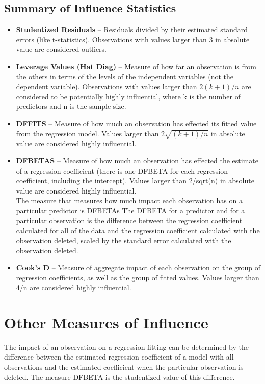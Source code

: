 \documentclass[residuals.tex]{subfiles}
\begin{document}
	\subsection{Summary of Influence Statistics}
	\begin{itemize}
		\item	\textbf{Studentized Residuals} – Residuals divided by their estimated standard errors (like t-statistics). Observations with values larger than 3 in absolute value are considered outliers.
		\item	\textbf{Leverage Values (Hat Diag)} – Measure of how far an observation is from the others in terms of the levels of the independent variables (not the dependent variable). Observations with values larger than $2(k+1)/n$ are considered to be potentially highly influential, where k is the number of predictors and n is the sample size.
		\item	\textbf{DFFITS} – Measure of how much an observation has effected its fitted value from the regression model. Values larger than $2\sqrt{(k+1)/n}$ in absolute value are considered highly influential. %
		\item	\textbf{DFBETAS} – Measure of how much an observation has effected the estimate of a regression coefficient (there is one DFBETA for each regression coefficient, including the intercept). Values larger than 2/sqrt(n) in absolute value are considered highly influential.
		\\
		The measure that measures how much impact each observation has on a particular predictor is DFBETAs The DFBETA for a predictor and for a particular observation is the difference between the regression coefficient calculated for all of the data and the regression coefficient calculated with the observation deleted, scaled by the standard error calculated with the observation deleted. 
		
		\item	\textbf{Cook’s D} – Measure of aggregate impact of each observation on the group of regression coefficients, as well as the group of fitted values. Values larger than 4/n are considered highly influential.
	\end{itemize}
	
	
\section{Other Measures of Influence}
The impact of an observation on a regression fitting can be determined by the difference between the estimated regression coefficient of a model with all observations and the estimated coefficient when the particular observation is deleted. The measure DFBETA is the studentized value of this difference.
\end{document}
